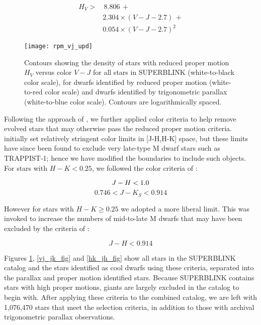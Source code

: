 \documentclass[twocolumn]{aastex62}
\begin{document}
\begin{equation}
\begin{split}
H_V > & \, 8.806 \, + \\ & 2.304 \times (V - J - 2.7) \, + \\ & 0.054 \times (V - J - 2.7)^2
\end{split}
\end{equation}


\begin{figure}
    \centering
 \texttt{[image: rpm\_vj\_upd]}
 \caption{Contours showing the density of stars with reduced proper motion $H_V$ versus color $V-J$ for all stars in SUPERBLINK (white-to-black color scale), for dwarfs identified by reduced proper motion (white-to-red color scale) and dwarfs identified by trigonometric parallax (white-to-blue color scale).  Contours are logarithmically spaced.\label{rpm_fig}}
\end{figure}

Following the approach of \citet[][]{Lepine2011}, we further applied color criteria to help remove evolved stars that may otherwise pass the reduced proper motion criteria. \citet{Lepine2011} initially set relatively stringent color limits in [J-H,H-K] space, but these limits have since been found to exclude very late-type M dwarf stars such as TRAPPIST-1; hence we have modified the boundaries to include such objects. For stars with $H-K<0.25$, we followed the color criteria of \citet[][]{Lepine2011}:

\begin{equation}
J - H < 1.0 \\
\end{equation}
\begin{equation}
0.746 < J - K_S < 0.914    
\end{equation}

However for stars with $H-K \ge 0.25$ we adopted a more liberal limit.  This was invoked to increase the numbers of mid-to-late M dwarfs that may have been excluded by the criteria of \citet[][]{Lepine2011}:

\begin{equation}
J - H < 0.914    
\end{equation}

Figures \ref{rpm_fig}, \ref{vj_jk_fig} and \ref{hk_jh_fig} show all stars in the SUPERBLINK catalog and the stars identified as cool dwarfs using these criteria, separated into the parallax and proper motion identified stars.  Because SUPERBLINK contains stars with high proper motions, giants are largely excluded in the catalog to begin with.  After applying these criteria to the combined catalog, we are left with 1,076,470 stars that meet the selection criteria, in addition to those with archival trigonometric parallax observations.
\end{document}
